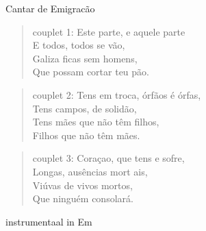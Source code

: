 \begin{song}[fado]{Cantar de Emigracão}
	
\begin{verse}{couplet 1:}
	Este parte, e aquele parte\\
	E todos, todos se vão,\\
	Galiza ficas sem homens,\\
	Que possam cortar teu pão. \phantom{xxxx}
\end{verse}
\begin{verse}{couplet 2:}
	Tens em troca, órfãos é  órfas,\\
	Tens campos, de solidão,\\
	Tens mães que não têm filhos,\\
	Filhos que não têm mães. \phantom{xxxx}
\end{verse}
\begin{verse}{couplet 3:}
	Coraçao, que tens e sofre,\\
	Longas, ausências mort ais,\\
	Viúvas de vivos mortos,\\
	Que ninguém consolará. \phantom{xxxxxx}
\end{verse}
\begin{instrumental}{instrumentaal in Em}
	 \\
	\\
\end{instrumental}


\end{song}
